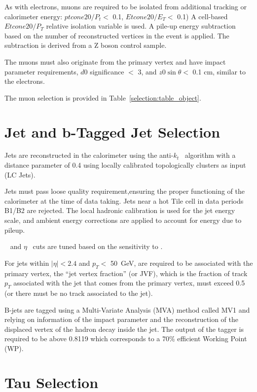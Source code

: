 As with electrons, muons are required to be isolated from 
additional tracking or calorimeter energy: $ptcone20/P_t <$ 0.1, $Etcone20/E_T <$ 0.1) A cell-based $Etcone20/P_T$ relative
isolation variable is used. A pile-up energy subtraction based 
on the number of reconstructed vertices in the event is applied. The
subtraction is derived from a Z boson control sample.


The muons must also originate from the primary vertex and have impact parameter requirements, $d0$ significance $<$ 3, and $z0\sin{\theta} <$ 0.1 cm, similar to the electrons. 


The muon selection is provided in Table~\ref{selection:table_object}. 

\section{Jet and b-Tagged Jet Selection}

Jets are reconstructed in the calorimeter using the anti-$k_t$~\cite{Cacciari:2008gp} algorithm
with a distance parameter of 0.4 using locally calibrated
topologically clusters as input (LC Jets). 

Jets must pass loose quality requirement,ensuring the proper
functioning of the calorimeter at the time of data taking. Jets near a hot Tile cell in data periods
B1/B2 are rejected. The local hadronic calibration is used for
the jet energy scale, and ambient energy corrections are applied to account
for energy due to pileup.

\pt~ and $\eta$~ cuts are tuned based on the sensitivity to \tth. 

For jets within $|\eta| < 2.4$ and $p_T <$ 50~GeV, are required to be
associated with the primary vertex, the ``jet vertex fraction'' (or JVF),
which is the fraction of track $p_T$ associated with the jet that comes from the primary vertex,
must exceed 0.5 (or there must be no track associated to the jet). 

B-jets are tagged using a Multi-Variate Analysis (MVA) method called MV1 and relying on information
of the impact parameter and the reconstruction of the displaced vertex of the
hadron decay inside the jet\cite{ATLAS-CONF-2011-102}.
The output of the tagger is required to be above 0.8119 which corresponds to a $70\%$ efficient Working Point (WP).

\section{Tau Selection} 

